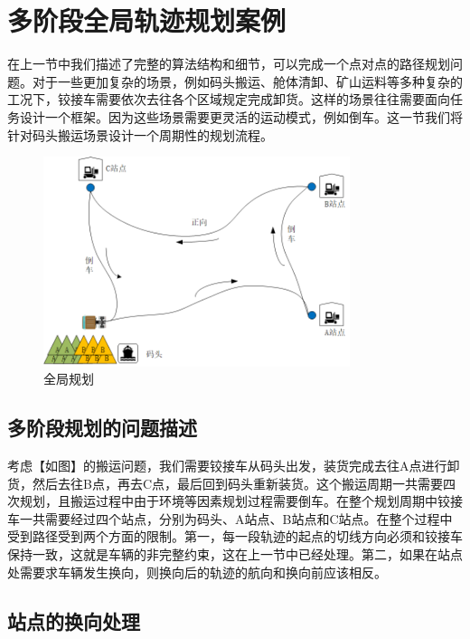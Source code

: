 \documentclass[master,academic]{ysuthesis} %
\begin{document}
	\section{多阶段全局轨迹规划案例}
	在上一节中我们描述了完整的算法结构和细节，可以完成一个点对点的路径规划问题。对于一些更加复杂的场景，例如码头搬运、舱体清卸、矿山运料等多种复杂的工况下，铰接车需要依次去往各个区域规定完成卸货。这样的场景往往需要面向任务设计一个框架。因为这些场景需要更灵活的运动模式，例如倒车。这一节我们将针对码头搬运场景设计一个周期性的规划流程。
	\begin{figure}[!ht]
		\centering
		\includegraphics[width=0.8\textwidth]{全局规划.png}
		\caption{全局规划}
		\label{fig:全局规划}
	\end{figure}
		\subsection{多阶段规划的问题描述}
		考虑【如图】的搬运问题，我们需要铰接车从码头出发，装货完成去往A点进行卸货，然后去往B点，再去C点，最后回到码头重新装货。这个搬运周期一共需要四次规划，且搬运过程中由于环境等因素规划过程需要倒车。在整个规划周期中铰接车一共需要经过四个站点，分别为码头、A站点、B站点和C站点。在整个过程中受到路径受到两个方面的限制。第一，每一段轨迹的起点的切线方向必须和铰接车保持一致，这就是车辆的非完整约束，这在上一节中已经处理。第二，如果在站点处需要求车辆发生换向，则换向后的轨迹的航向和换向前应该相反。 

		\subsection{站点的换向处理}
		
\end{document}
